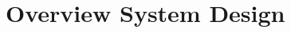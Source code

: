 \newpage\sloppy
\setlength{\RaggedRightRightskip}{0pt plus 2em}
\section{Overview System Design}

\fussy
